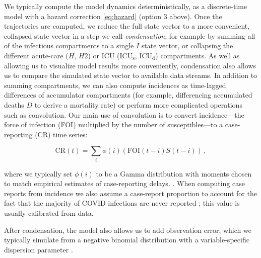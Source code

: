\documentclass[12pt]{article}\usepackage[]{graphicx}\usepackage[]{color}
\begin{document}
We typically compute the model dynamics deterministically, as a discrete-time model with a hazard correction \eqref{eq:hazard} (option 3 above).  Once the trajectories are computed, we reduce the full state vector to a more convenient, collapsed state vector in a step we call \emph{condensation}, for example by summing all of the infectious compartments to a single $I$ state vector, or collapsing the different acute-care ($H$, $H2$) or ICU ($\textrm{ICU}_\textrm{s}$, $\textrm{ICU}_\textrm{d}$)
compartments.
As well as allowing us to visualize model results more conveniently, condensation also allows us to compare the simulated state vector to available data streams.
In addition to summing compartments, we can also compute incidences as time-lagged differences of accumulator compartments (for example, differencing accumulated deaths $D$ to derive a mortality rate) or perform more complicated operations such as convolution. 
Our main use of convolution is to convert incidence---the force of infection (FOI) multiplied by the number of susceptibles---to a case-reporting (CR) time series: 
\begin{linenomath*}
\begin{equation}\label{eq:CR}
\textrm{CR}(t) = \sum_i \phi(i) (\textrm{FOI}(t-i) S(t-i))\,,
\end{equation}
\end{linenomath*}
where we typically set $\phi(i)$ to be a Gamma distribution with
moments chosen to match empirical estimates of case-reporting delays.
.
When computing case reports from incidence we also assume a case-report proportion  to account for the fact that the majority of COVID infections are never reported \cite{Doug+2020}; this value is usually calibrated from data.

After condensation, the model also allows us to add observation error, which we typically simulate from a negative binomial distribution with a variable-specific dispersion parameter \cite{linden2011using}.
\end{document}

